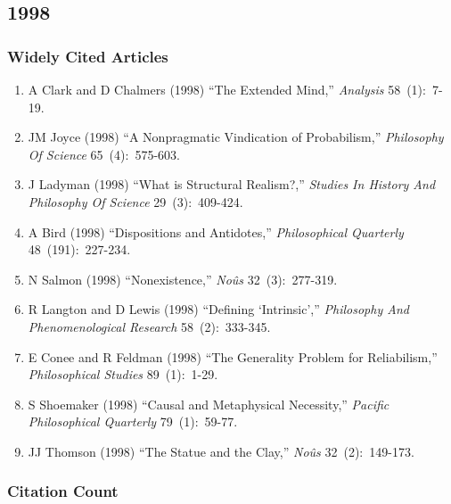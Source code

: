 \documentclass[
  10pt,
  letterpaper,
  DIV=11,
  numbers=noendperiod,
  twoside]{scrartcl}
\providecommand{\tightlist}{%
  \setlength{\itemsep}{0pt}\setlength{\parskip}{0pt}}\usepackage{longtable,booktabs,array}
\begin{document}
\newpage

\subsection{1998}\label{sec-s1998}

\subsubsection*{Widely Cited Articles}\label{widely-cited-articles-41}

\begin{enumerate}
\def\labelenumi{\arabic{enumi}.}
\tightlist
\item
  A Clark and D Chalmers (1998) ``The Extended Mind,'' \emph{Analysis}
  58~(1):~7-19.
\item
  JM Joyce (1998) ``A Nonpragmatic Vindication of Probabilism,''
  \emph{Philosophy Of Science} 65~(4):~575-603.
\item
  J Ladyman (1998) ``What is Structural Realism?,'' \emph{Studies In
  History And Philosophy Of Science} 29~(3):~409-424.
\item
  A Bird (1998) ``Dispositions and Antidotes,'' \emph{Philosophical
  Quarterly} 48~(191):~227-234.
\item
  N Salmon (1998) ``Nonexistence,'' \emph{Noûs} 32~(3):~277-319.
\item
  R Langton and D Lewis (1998) ``Defining `Intrinsic',''
  \emph{Philosophy And Phenomenological Research} 58~(2):~333-345.
\item
  E Conee and R Feldman (1998) ``The Generality Problem for
  Reliabilism,'' \emph{Philosophical Studies} 89~(1):~1-29.
\item
  S Shoemaker (1998) ``Causal and Metaphysical Necessity,''
  \emph{Pacific Philosophical Quarterly} 79~(1):~59-77.
\item
  JJ Thomson (1998) ``The Statue and the Clay,'' \emph{Noûs}
  32~(2):~149-173.
\end{enumerate}

\subsubsection*{Citation Count}\label{sec-count-1998}
\end{document}
